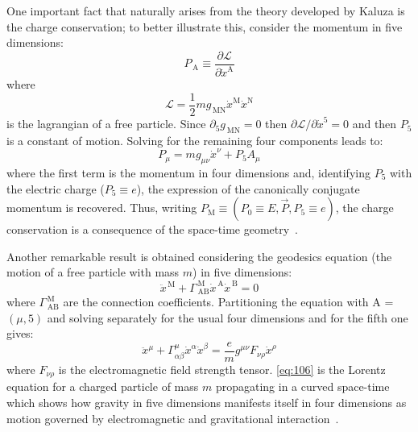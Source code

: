One important fact that naturally arises from the theory developed by Kaluza is
the charge conservation; to better illustrate this, consider the momentum in
five dimensions:
\begin{equation}
  \label{eq:76}
  P_\mathrm{\, A} \equiv \frac{\partial \mathcal{L}}{\partial \dot{x}^\mathrm{A}}
\end{equation}
where
\begin{equation}
  \label{eq:97}
  \mathcal{L} = \frac{1}{2} m g_{\mathrm{\, MN}} \dot{x}^\mathrm{M} \dot{x}^\mathrm{N}
\end{equation}
is the lagrangian of a free particle. Since $\partial_5 g_{\mathrm{\, MN}} = 0$
then $\partial \mathcal{L}/ \partial \dot{x}^5 = 0$ and then $P_5$ is a constant
of motion. Solving for the remaining four components leads to:
\begin{equation}
  \label{eq:99}
  P_\mu = m g_{\mu\nu} \dot{x}^\nu + P_5 A_\mu
\end{equation}
where the first term is the momentum in four dimensions and, identifying $P_5$
with the electric charge ($P_5 \equiv e$), the expression of the canonically
conjugate momentum is recovered. Thus, writing $P_\mathrm{M} \equiv (P_0 \equiv
E, \vec{P}, P_5 \equiv e)$, the charge conservation is a consequence of the
space-time geometry~\cite{KKConsequences}.

Another remarkable result is obtained considering the geodesics equation (the
motion of a free particle with mass $m$) in five dimensions:
\begin{equation}
  \label{eq:105}
  \ddot{x}^\mathrm{\, M} + \Gamma^\mathrm{\, M}_{\mathrm{\, AB}}
  \dot{x}^\mathrm{\, A} \dot{x}^\mathrm{\, B} = 0
\end{equation}
where $\Gamma^\mathrm{\, M}_{\mathrm{\, AB}}$ are the connection
coefficients. Partitioning the equation with A = $(\mu, 5)$ and solving
separately for the usual four dimensions and for the fifth one gives:
\begin{equation}
  \label{eq:106}
  \ddot{x}^\mu + \Gamma^\mu_{\alpha \beta} \dot{x}^\alpha \dot{x}^\beta =
  \frac{e}{m} g^{\mu\nu} F_{\nu \rho} \dot{x}^\rho
\end{equation}
where $F_{\nu \rho}$ is the electromagnetic field strength tensor. \cref{eq:106}
is the Lorentz equation for a charged particle of mass $m$ propagating in a
curved space-time which shows how gravity in five dimensions manifests itself in
four dimensions as motion governed by electromagnetic and gravitational
interaction~\cite{KKConsequences}.

